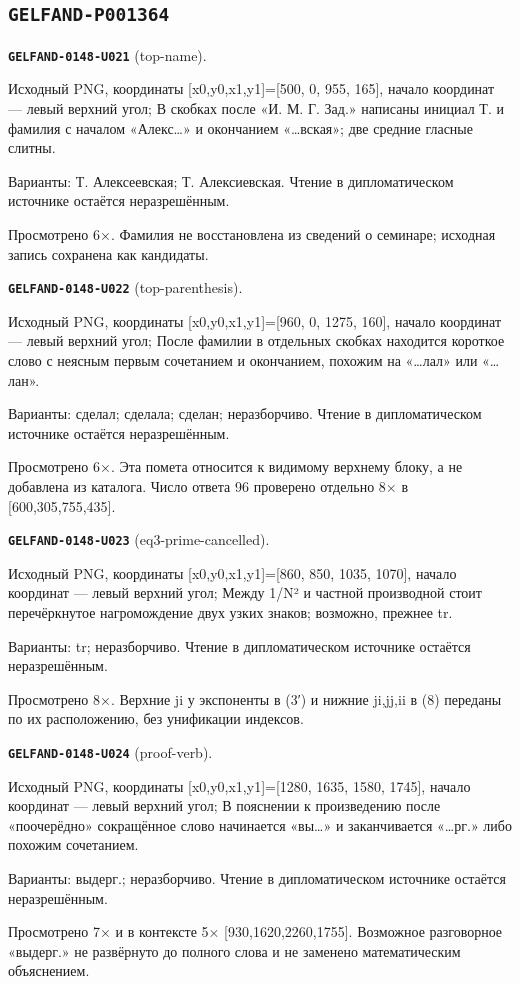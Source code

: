 \documentclass[11pt]{article}
\theoremstyle{definition}
\theoremstyle{remark}
\begin{document}
\subsection*{\texttt{GELFAND-P001364}}
\noindent\leavevmode{}\label{GELFAND-P001364:top-name:note}\textbf{\texttt{GELFAND-0148-U021}} (top-name).\par\nopagebreak[4]
Исходный PNG, координаты [x0,y0,x1,y1]=[500, 0, 955, 165], начало координат — левый верхний угол; В скобках после «И. М. Г. Зад.» написаны инициал Т. и фамилия с началом «Алекс…» и окончанием «…вская»; две средние гласные слитны.\par
Варианты: Т. Алексеевская; Т. Алексиевская. Чтение в дипломатическом источнике остаётся неразрешённым.\par
Просмотрено 6×. Фамилия не восстановлена из сведений о семинаре; исходная запись сохранена как кандидаты.\par\medskip
\noindent\leavevmode{}\label{GELFAND-P001364:top-parenthesis:note}\textbf{\texttt{GELFAND-0148-U022}} (top-parenthesis).\par\nopagebreak[4]
Исходный PNG, координаты [x0,y0,x1,y1]=[960, 0, 1275, 160], начало координат — левый верхний угол; После фамилии в отдельных скобках находится короткое слово с неясным первым сочетанием и окончанием, похожим на «…лал» или «…лан».\par
Варианты: сделал; сделала; сделан; неразборчиво. Чтение в дипломатическом источнике остаётся неразрешённым.\par
Просмотрено 6×. Эта помета относится к видимому верхнему блоку, а не добавлена из каталога. Число ответа 96 проверено отдельно 8× в [600,305,755,435].\par\medskip
\noindent\leavevmode{}\label{GELFAND-P001364:eq3-prime-cancelled:note}\textbf{\texttt{GELFAND-0148-U023}} (eq3-prime-cancelled).\par\nopagebreak[4]
Исходный PNG, координаты [x0,y0,x1,y1]=[860, 850, 1035, 1070], начало координат — левый верхний угол; Между 1/N² и частной производной стоит перечёркнутое нагромождение двух узких знаков; возможно, прежнее tr.\par
Варианты: tr; неразборчиво. Чтение в дипломатическом источнике остаётся неразрешённым.\par
Просмотрено 8×. Верхние ji у экспоненты в (3′) и нижние ji,jj,ii в (8) переданы по их расположению, без унификации индексов.\par\medskip
\noindent\leavevmode{}\label{GELFAND-P001364:proof-verb:note}\textbf{\texttt{GELFAND-0148-U024}} (proof-verb).\par\nopagebreak[4]
Исходный PNG, координаты [x0,y0,x1,y1]=[1280, 1635, 1580, 1745], начало координат — левый верхний угол; В пояснении к произведению после «поочерёдно» сокращённое слово начинается «вы…» и заканчивается «…рг.» либо похожим сочетанием.\par
Варианты: выдерг.; неразборчиво. Чтение в дипломатическом источнике остаётся неразрешённым.\par
Просмотрено 7× и в контексте 5× [930,1620,2260,1755]. Возможное разговорное «выдерг.» не развёрнуто до полного слова и не заменено математическим объяснением.\par\medskip
\end{document}
